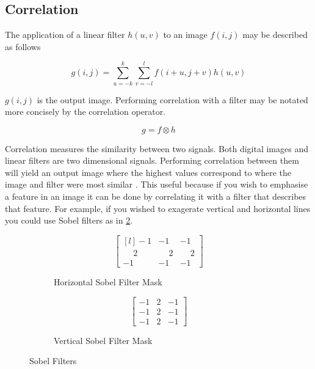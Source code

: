 \subsection{Correlation}
\label{subsection:corr}
The application of a linear filter $h(u,v)$ to an image $f(i,j)$ may be described as follows

\begin{equation} \label{eq:1}
g(i,j) = \sum_{u=-k}^{k}\sum_{v = -l}^{l}f(i+u,j+v)h(u,v)
\end{equation}

$g(i,j)$ is the output image. Performing correlation with a filter may be notated more concisely by the correlation operator.

\[g = f \otimes h\]

Correlation measures the similarity between two signals. Both digital images and linear filters are two dimensional signals. Performing correlation between them will yield an output image where the highest values correspond to where the image and filter were most similar \cite{optimalKernel}. This useful because if you wish to emphasise a feature in an image it can be done by correlating it with a filter that describes that feature. For example, if you wished to exagerate vertical and horizontal lines you could use Sobel filters as in \ref{fig:sobel_filters}. 

\begin{figure}[H]
  \begin{subfigure}[b]{0.49\textwidth}
    \[
    \begin{bmatrix*}[l]
     -1 & -1 & -1 \\
      \phantom{-}2 & \phantom{-}2 & \phantom{-}2 \\
      -1 & -1 & -1 
    \end{bmatrix*}
    \]
    \caption{Horizontal Sobel Filter Mask}
    \label{rfidtest_xaxis}
\end{subfigure}
\begin{subfigure}[b]{0.49\textwidth}
  \[ 
    \begin{bmatrix}
      -1 & 2 & -1 \\
      -1 & 2 & -1 \\
      -1 & 2 & -1
    \end{bmatrix}
    \]
    \caption{Vertical Sobel Filter Mask}  
\end{subfigure}
    \caption{Sobel Filters}
    \label{fig:sobel_filters}
\end{figure}

